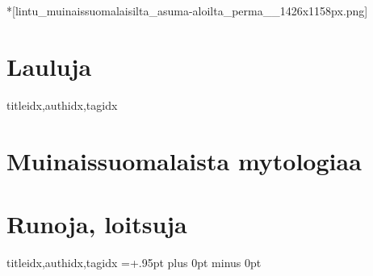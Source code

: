   *[lintu_muinaissuomalaisilta_asuma-aloilta_perma__1426x1158px.png]
    \begin{finnish} %
      \section{Lauluja}
        \begin{songs}{titleidx,authidx,tagidx}
          
          
        \end{songs}
      \clearpage\scleardpage
      \section{Muinaissuomalaista mytologiaa}
        
      \clearpage\scleardpage
      \section{Runoja, loitsuja}
        \begin{songs}{titleidx,authidx,tagidx}
          \chordsoff %
          \baselineadj=+.95pt plus 0pt minus 0pt %
          \renewcommand{\lyricfont}{\small} %
          
          \renewcommand{\lyricfont}{\defaultlyricfont} %
          \baselineadj=0pt %
          \chordson %
        \end{songs}
    \end{finnish}

